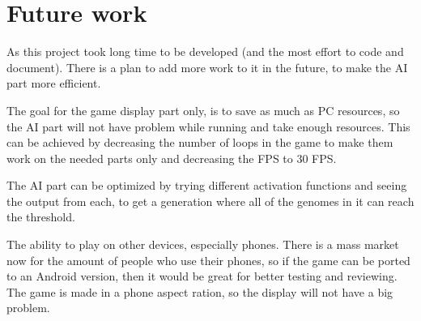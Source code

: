 \section{Future work}
As this project took long time to be developed (and the most effort to code and document). There is a plan to add more work to it in the future, to make the AI part more efficient.

The goal for the game display part only, is to save as much as PC resources, so the AI part will not have problem while running and take enough resources. This can be achieved by decreasing the number of loops in the game to make them work on the needed parts only and decreasing the FPS to 30 FPS.

The AI part can be optimized by trying different activation functions and seeing the output from each, to get a generation where all of the genomes in it can reach the threshold.

The ability to play on other devices, especially phones. There is a mass market now for the amount of people who use their phones, so if the game can be ported to an Android version, then it would be great for better testing and reviewing. The game is made in a phone aspect ration, so the display will not have a big problem. 
